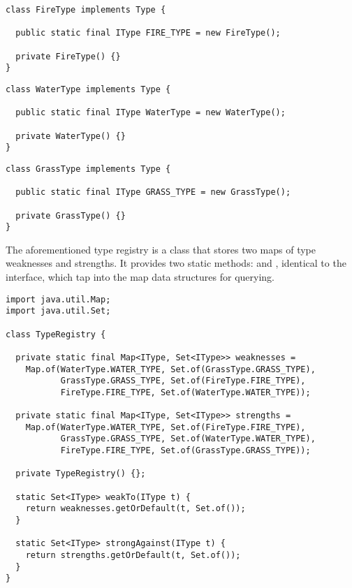 \begin{lstlisting}[language=MyJava]
class FireType implements Type {

  public static final IType FIRE_TYPE = new FireType();

  private FireType() {}
}
\end{lstlisting}

\begin{lstlisting}[language=MyJava]
class WaterType implements Type {

  public static final IType WaterType = new WaterType();

  private WaterType() {}
}
\end{lstlisting}

\begin{lstlisting}[language=MyJava]
class GrassType implements Type {

  public static final IType GRASS_TYPE = new GrassType();

  private GrassType() {}
}
\end{lstlisting}

The aforementioned type registry is a class that stores two maps of type weaknesses and strengths. It provides two static methods:  and , identical to the  interface, which tap into the map data structures for querying.

\begin{lstlisting}[language=MyJava]
import java.util.Map;
import java.util.Set;

class TypeRegistry {

  private static final Map<IType, Set<IType>> weaknesses =
    Map.of(WaterType.WATER_TYPE, Set.of(GrassType.GRASS_TYPE),
           GrassType.GRASS_TYPE, Set.of(FireType.FIRE_TYPE),
           FireType.FIRE_TYPE, Set.of(WaterType.WATER_TYPE));

  private static final Map<IType, Set<IType>> strengths =
    Map.of(WaterType.WATER_TYPE, Set.of(FireType.FIRE_TYPE),
           GrassType.GRASS_TYPE, Set.of(WaterType.WATER_TYPE),
           FireType.FIRE_TYPE, Set.of(GrassType.GRASS_TYPE));

  private TypeRegistry() {};

  static Set<IType> weakTo(IType t) {
    return weaknesses.getOrDefault(t, Set.of());
  }

  static Set<IType> strongAgainst(IType t) {
    return strengths.getOrDefault(t, Set.of());
  }
}
\end{lstlisting}

